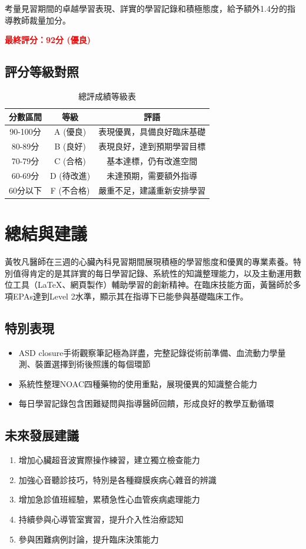 \documentclass[12pt,a4paper]{article}
\begin{document}
考量見習期間的卓越學習表現、詳實的學習記錄和積極態度，給予額外1.4分的指導教師裁量加分。

\textcolor{red}{\Large \textbf{最終評分：92分 (優良)}}

\subsection{評分等級對照}
\begin{table}[h]
\centering
\caption{總評成績等級表}
\begin{tabular}{|c|c|c|}
\hline
\textbf{分數區間} & \textbf{等級} & \textbf{評語} \\
\hline
90-100分 & A (優良) & 表現優異，具備良好臨床基礎 \\
\hline
80-89分 & B (良好) & 表現良好，達到預期學習目標 \\
\hline
70-79分 & C (合格) & 基本達標，仍有改進空間 \\
\hline
60-69分 & D (待改進) & 未達預期，需要額外指導 \\
\hline
60分以下 & F (不合格) & 嚴重不足，建議重新安排學習 \\
\hline
\end{tabular}
\end{table}

\section{總結與建議}

黃牧凡醫師在三週的心臟內科見習期間展現積極的學習態度和優異的專業素養。特別值得肯定的是其詳實的每日學習記錄、系統性的知識整理能力，以及主動運用數位工具（LaTeX、網頁製作）輔助學習的創新精神。在臨床技能方面，黃醫師於多項EPAs達到Level 2水準，顯示其在指導下已能參與基礎臨床工作。

\subsection{特別表現}
\begin{itemize}
\item ASD closure手術觀察筆記極為詳盡，完整記錄從術前準備、血流動力學量測、裝置選擇到術後照護的每個環節
\item 系統性整理NOAC四種藥物的使用重點，展現優異的知識整合能力
\item 每日學習記錄包含困難疑問與指導醫師回饋，形成良好的教學互動循環
\end{itemize}

\subsection{未來發展建議}
\begin{enumerate}
\item 增加心臟超音波實際操作練習，建立獨立檢查能力
\item 加強心音聽診技巧，特別是各種瓣膜疾病心雜音的辨識
\item 增加急診值班經驗，累積急性心血管疾病處理能力
\item 持續參與心導管室實習，提升介入性治療認知
\item 參與困難病例討論，提升臨床決策能力
\end{enumerate}
\end{document}
